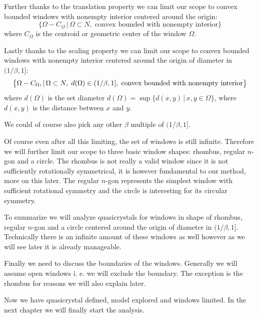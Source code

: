 \documentclass[text.tex]{subfiles}
\begin{document}
Further thanks to the translation property we can limit our scope to convex bounded windows with nonempty interior centered around the origin: 
$$\big\{\Omega-C_\Omega\,|\, \Omega\subset N ,\;\text{convex bounded with nonempty interior}\big\}$$
where $C_\Omega$ is the centroid or geometric center of the window $\Omega$. 

Lastly thanks to the scaling property we can limit our scope to convex bounded windows with nonempty interior centered around the origin of diameter in $(1/\beta,1]$:
$$\big\{\Omega-C_\Omega\\,|\, \Omega\subset N ,\; d(\Omega)\in (1/\beta,1] ,\;\text{convex bounded with nonempty interior}\big\}$$
where $d(\Omega)$ is the set diameter $d(\Omega) = \sup\{d(x,y)\,|\,x,y\in\Omega\}$, where $d(x,y)$ is the distance between $x$ and $y$. 

\begin{remark}
We could of course also pick any other $\beta$ multiple of $(1/\beta,1]$. 
\end{remark}

Of course even after all this limiting, the set of windows is still infinite. Therefore we will further limit our scope to three basic window shapes: rhombus, regular $n$-gon and a circle. The rhombus is not really a valid window since it is not sufficiently rotationally symmetrical, it is however fundamental to our method, more on this later. The regular $n$-gon represents the simplest window with sufficient rotational symmetry and the circle is interesting for its circular symmetry. 

To summarize we will analyze quasicrystals for windows in shape of rhombus, regular $n$-gon and a circle centered around the origin of diameter in $(1/\beta,1]$. Technically there is an infinite amount of these windows as well however as we will see later it is already manageable. 

Finally we need to discuss the boundaries of the windows. Generally we will assume open windows i. e. we will exclude the boundary. The exception is the rhombus for reasons we will also explain later. 

Now we have quasicrystal defined, model explored and windows limited. In the next chapter we will finally start the analysis. 
\end{document}
